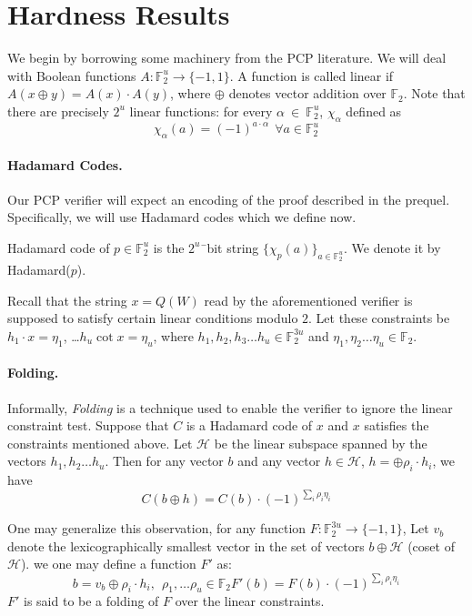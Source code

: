 \section{Hardness Results}\label{section:hardness}

We begin by borrowing some machinery from the PCP literature. 
We will deal with Boolean functions $A:\mathbb{F}^u_2 \rightarrow
\{-1, 1\}$.  A function is called linear if $A(x \oplus y) = A(x)
\cdot A(y)$, where $\oplus$ denotes vector addition over
$\mathbb{F}_2$. Note that there are precisely $2^u$ linear functions:
for every $\alpha\ \in \ \mathbb{F}^u_2$, $\chi_\alpha$
defined as
\[
\chi_\alpha(a) = (-1)^{a \cdot \alpha} ~~\forall a \in \mathbb{F}^u_2
\]


\paragraph{Hadamard Codes.} Our PCP verifier will
expect an encoding of the proof described in the prequel.
Specifically, we will use Hadamard codes which we define now.


\begin{definition}
Hadamard code of $p \in \mathbb{F}^{u}_2$ is the $2^u$¯bit string 
$\{\chi_p(a)\}_{a \in \mathbb{F}^u_2}$. We denote it by Hadamard($p$).
\end{definition}

Recall that the string $x = Q(W)$ read by the aforementioned verifier
is supposed to satisfy certain linear conditions modulo $2$. Let these
constraints be $h_1 \cdot x = \eta_1$, \ldots $h_u \cot x = \eta_u$,
where $h_1, h_2, h_3 \ldots h_u \in \mathbb{F}^{3u}_2$ and $\eta_1,
\eta_2 \ldots \eta_u \in \mathbb{F}_2$.

\paragraph{Folding.}Informally, {\em Folding} is a technique used to enable the verifier to 
ignore the linear constraint test. Suppose that $C$ is a Hadamard code
of $x$ and $x$ satisfies the constraints mentioned above.  Let
${\mathcal H}$ be the linear subspace spanned by the vectors $h_1, h_2
\ldots h_u$.  Then for any vector $b$ and any vector $h \in {\mathcal
  H}$, $h = \oplus \rho_i \cdot h_i$, we have
\[
      C(b \oplus h) = C(b)\cdot(-1)^{\sum_i \rho_i \eta_i}
\]

One may generalize this observation, for any function $F:
\mathbb{F}^{3u}_2 \rightarrow \{-1, 1\}$, Let $v_b$ denote the
lexicographically smallest vector in the set of vectors $b \oplus
{\mathcal H}$ (coset of ${\mathcal H}$).  we one may define a function
$F'$ as:
\[
b = v_b \oplus \rho_i\cdot h_i, ~~ \rho_1,\ldots \rho_u \in \mathbb{F}_2
F'(b) = F(b) \cdot (-1)^{\sum_i \rho_i \eta_i}
\]
$F'$ is said to be a folding of $F$ over the linear constraints.

